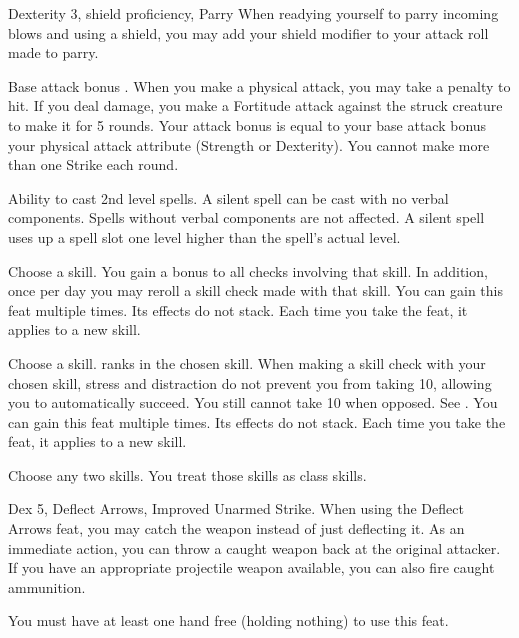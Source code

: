 \featpres Dexterity 3, shield proficiency, Parry
\featben When readying yourself to parry incoming blows and using a shield, you may add your shield modifier to your attack roll made to parry.

\featpre Base attack bonus .
\featben When you make a physical attack, you may take a  penalty to hit. If you deal damage, you make a Fortitude attack against the struck creature to make it \sickened for 5 rounds. Your attack bonus is equal to your base attack bonus \add your physical attack attribute (Strength or Dexterity). You cannot make more than one Strike each round.

 Ability to cast 2nd level spells.
 A silent spell can be cast with no verbal components. Spells without verbal components are not affected. A silent spell uses up a spell slot one level higher than the spell's actual level.

Choose a skill.
 You gain a  bonus to all checks involving that skill. In addition, once per day you may reroll a skill check made with that skill.
 You can gain this feat multiple times. Its effects do not stack. Each time you take the feat, it applies to a new skill.

Choose a skill.
 ranks in the chosen skill.
\featben When making a skill check with your chosen skill, stress and distraction do not prevent you from taking 10, allowing you to automatically succeed. You still cannot take 10 when opposed. See .
 You can gain this feat multiple times. Its effects do not stack. Each time you take the feat, it applies to a new skill.

\featben Choose any two skills. You treat those skills as class skills.

 Dex 5, Deflect Arrows, Improved Unarmed Strike.
 When using the Deflect Arrows feat, you may catch the weapon instead of just deflecting it. As an immediate action, you can throw a caught weapon back at the original attacker. If you have an appropriate projectile weapon available, you can also fire caught ammunition.
\par You must have at least one hand free (holding nothing) to use this feat.

